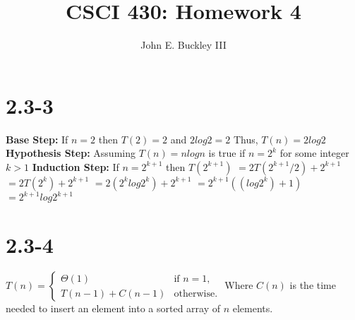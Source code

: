 \documentclass[12pt]{article}
\author{John E. Buckley III}
\title{CSCI 430: Homework 4}
\begin{document}
\maketitle

\section{2.3-3}
\textbf{Base Step:} \newline
If $n=2$ then $T(2)=2$ and $2log2=2$ Thus, $T(n)=2log2$ \newline \newline
\textbf{Hypothesis Step:} \newline
Assuming $T(n)=nlogn$ is true if $n=2^k$ for some integer $k>1$ \newline \newline
\textbf{Induction Step:} \newline
If $n=2^{k+1}$ then $T(2^{k+1})$ \newline
$=2T(2^{k+1}/2)+2^{k+1}$ \newline
$=2T(2^k)+2^{k+1}$ \newline
$=2(2^klog2^k)+2^{k+1}$ \newline
$=2^{k+1}((log2^k)+1)$ \newline
$=2^{k+1}log2^{k+1}$ 

\section{2.3-4}
$ T(n) = \begin{cases} \Theta(1) & \text{if } n = 1, \\ T(n-1) + C(n-1) & \text{otherwise}. \end{cases} $ \newline \newline
Where $C(n)$ is the time needed to insert an element into a sorted array of $n$ elements.
\end{document}
